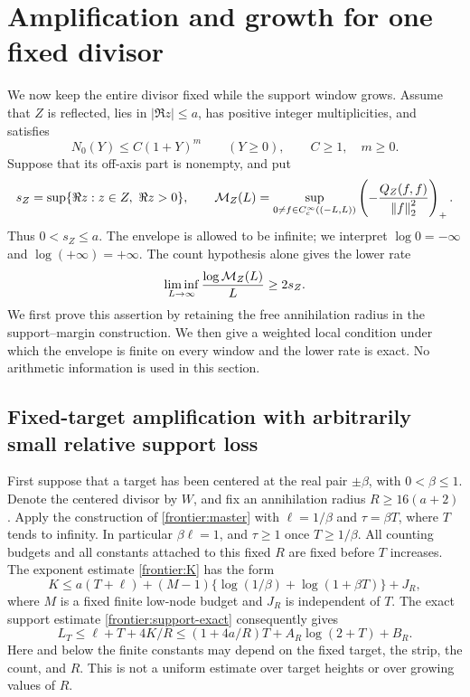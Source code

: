 \section{Amplification and growth for one fixed divisor}
\label{sec:growth}

We now keep the entire divisor fixed while the support window grows.
Assume that \(Z\) is reflected, lies in \(|\Re z|\le a\), has
positive integer multiplicities, and satisfies
\begin{equation}\label{grow:count}
 N_0(Y)\le C(1+Y)^m\qquad(Y\ge0),
 \qquad C\ge1,\quad m\ge0.
\end{equation}
Suppose that its off-axis part is nonempty, and put
\begin{equation}\label{grow:definitions}
 s_Z=\sup\{\Re z:z\in Z,\ \Re z>0\},\qquad
 \mathcal M_Z(L)=\sup_{0\ne f\in C_c^\infty((-L,L))}
       \left(-\frac{Q_Z(f,f)}{\left\|f\right\|_2^2}\right)_+.
\end{equation}
Thus \(0<s_Z\le a\). The envelope is allowed to be infinite;
we interpret \(\log0=-\infty\) and \(\log(+\infty)=+\infty\).
The count hypothesis alone gives the lower rate
\begin{equation}\label{grow:lower-rate}
 \liminf_{L\to\infty}\frac{\log\mathcal M_Z(L)}L\ge2s_Z.
\end{equation}
We first prove this assertion by retaining the free annihilation radius
in the support--margin construction. We then give a weighted local
condition under which the envelope is finite on every window and the
lower rate is exact. No arithmetic information is used in this section.

\subsection{Fixed-target amplification with arbitrarily small relative support loss}

First suppose that a target has been centered at the real pair
\(\pm\beta\), with \(0<\beta\le1\). Denote the centered divisor
by \(W\), and fix an annihilation radius \(R\ge16(a+2)\).
Apply the construction of \eqref{frontier:master} with
\(\ell=1/\beta\) and \(\tau=\beta T\), where \(T\) tends to
infinity. In particular \(\beta\ell=1\), and \(\tau\ge1\)
once \(T\ge1/\beta\). All counting budgets and all constants
attached to this fixed \(R\) are fixed before \(T\) increases.
The exponent estimate \eqref{frontier:K} has the form
\begin{equation}\label{grow:fixed-radius-K}
 K\le a(T+\ell)+(M-1)
       \{\log(1/\beta)+\log(1+\beta T)\}+J_R,
\end{equation}
where \(M\) is a fixed finite low-node budget and \(J_R\) is
independent of \(T\). The exact support estimate
\eqref{frontier:support-exact} consequently gives
\begin{equation}\label{grow:fixed-radius-support}
 L_T\le\ell+T+4K/R
 \le (1+4a/R)T+A_R\log(2+T)+B_R.
\end{equation}
Here and below the finite constants may depend on the fixed target,
the strip, the count, and \(R\). This is not a uniform estimate
over target heights or over growing values of \(R\).

